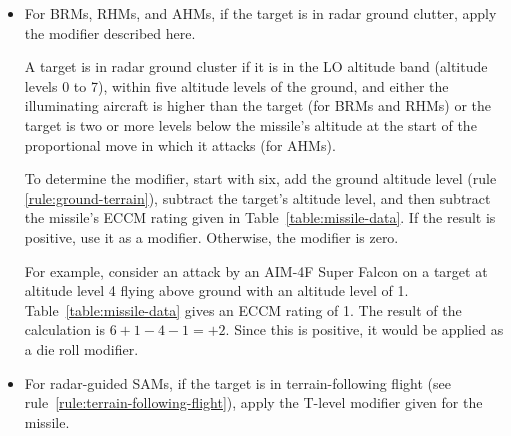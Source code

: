 {\begin{itemize}
    For example, consider an AA-3-2 missile attacking an aircraft using an active DDS. \ref{table:missile-data} gives a chaff vulnerability rating of 4, so the corresponding mini-jammer vulnerability rating is 5 (one more). If the target’s mini-jammer PPL is 3, the modifier is $+3$ (limited by the PPL), but if the target’s mini-jammer PPL is 6, the modifier is $+5$ (limited by the mini-jammer vulnerability rating).
    
    \item For BRMs, RHMs, and AHMs, if the target is in radar ground clutter, apply the modifier described here.

    A target is in radar ground cluster if it is in the LO altitude band (altitude levels 0 to 7), within five altitude levels of the ground, and either the illuminating aircraft is higher than the target (for BRMs and RHMs) or the target is two or more levels below the missile’s altitude at the start of the proportional move in which it attacks (for AHMs).

    To determine the modifier, start with six, add the ground altitude level (rule \ref{rule:ground-terrain}), subtract the target’s altitude level, and then subtract the missile’s ECCM rating given in Table~\ref{table:missile-data}. If the result is positive, use it as a modifier. Otherwise, the modifier is zero.

    For example, consider an attack by an AIM-4F Super Falcon on a target at altitude level 4 flying above ground with an altitude level of 1. Table~\ref{table:missile-data} gives an ECCM rating of 1. The result of the calculation is $6 + 1 - 4 - 1 = +2$. Since this is positive, it would be applied as a die roll modifier.

    \item For radar-guided SAMs, if the target is in terrain-following flight (see rule~\ref{rule:terrain-following-flight}), apply the T-level modifier given for the missile.
    
    \end{itemize}
}

